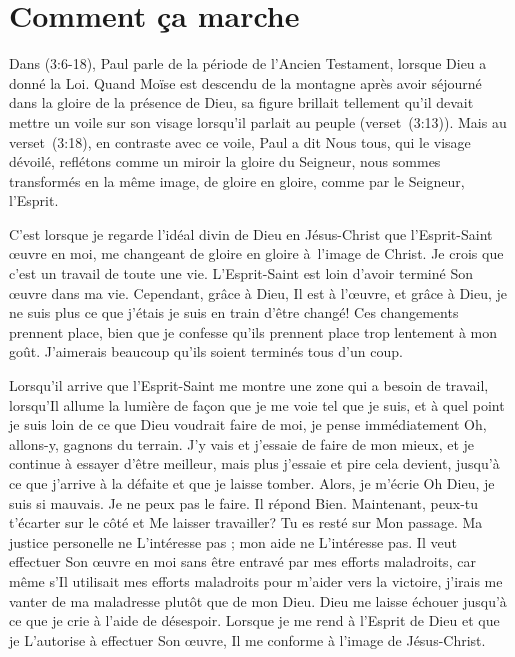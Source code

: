 \section{Comment \c{c}a marche}

Dans (3:6-18), Paul parle de la période
 de l'Ancien Testament, lorsque Dieu a donné la Loi.
 Quand Moïse est descendu de la montagne après avoir séjourné
 dans la gloire de la présence de Dieu,
 sa figure brillait tellement qu'il devait mettre un voile sur son visage
 lorsqu'il parlait au peuple (verset~(3:13)).
 Mais au verset~(3:18), en contraste avec ce voile,
 Paul a dit\frcolon{}
 \Og Nous tous, qui le visage dévoilé, reflétons comme un miroir
 la gloire du Seigneur, nous sommes transformés en la même image,
 de gloire en gloire, comme par le Seigneur,
 l'Esprit. \Fg{}

C'est lorsque je regarde l'idéal divin de Dieu en Jésus-Christ
 que l'Esprit-Saint œuvre en moi, me changeant de gloire en gloire
 à~l'image de Christ.
 Je crois que c'est un travail de toute une vie.
 L'Es\-prit-Saint est loin d'avoir terminé Son œuvre dans ma vie.
 Cependant, grâce à Dieu, Il est à l'œuvre, et grâce à Dieu,
 je ne suis plus ce que j'étais
 \ocadr je suis en train d'être changé!
 Ces changements prennent place, bien que je confesse qu'ils prennent place
 trop lentement à mon goût.
 J'aimerais beaucoup qu'ils soient terminés tous d'un coup.

Lorsqu'il arrive que l'Esprit-Saint me montre une zone qui a besoin de travail,
 lorsqu'Il allume la lumière de façon que je me voie tel que je suis,
 et à quel point je suis loin de ce que Dieu voudrait faire de moi,
 je pense immédiatement\frcolon{}
 \Og Oh, allons-y, gagnons du terrain. \Fg{}
 J'y vais et j'essaie de faire de mon mieux,
 et je continue à essayer d'être meilleur,
 mais plus j'essaie et pire cela devient,
 jusqu'à ce que j'arrive à la défaite et que je laisse tomber.
 Alors, je m'écrie\frcolon{}
 \Og Oh Dieu, je suis si mauvais. Je ne peux pas le faire. \Fg{}
 Il répond\frcolon{}
 \Og Bien. Maintenant, peux-tu t'écarter sur le côté et Me laisser travailler?
 Tu es resté sur Mon passage. \Fg{}
 Ma justice personelle ne L'intéresse pas ;
 mon aide ne L'intéresse pas.
 Il veut effectuer Son œuvre en moi sans être entravé
 par mes efforts maladroits,
 car même s'Il utilisait mes efforts maladroits
 pour m'aider vers la victoire,
 j'irais me vanter de ma maladresse plutôt que de mon Dieu.
 Dieu me laisse échouer jusqu'à ce que je crie à l'aide de désespoir.
 Lorsque je me rend à l'Esprit de Dieu et que je L'autorise
 à effectuer Son œuvre, Il me conforme à l'image de Jésus-Christ.


